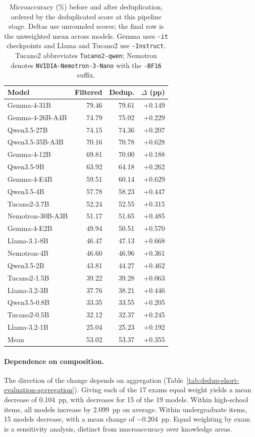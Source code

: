 \begin{table}[t]
\centering
\footnotesize
\setlength{\tabcolsep}{3pt}
\begin{tabular}{@{}lrrr@{}}
\toprule
Model & Filtered & Dedup. & $\Delta$ (pp) \\
\midrule
Gemma-4-31B & 79.46 & 79.61 & +0.149 \\
Gemma-4-26B-A4B & 74.79 & 75.02 & +0.229 \\
Qwen3.5-27B & 74.15 & 74.36 & +0.207 \\
Qwen3.5-35B-A3B & 70.16 & 70.78 & +0.628 \\
Gemma-4-12B & 69.81 & 70.00 & +0.188 \\
Qwen3.5-9B & 63.92 & 64.18 & +0.262 \\
Gemma-4-E4B & 59.51 & 60.14 & +0.629 \\
Qwen3.5-4B & 57.78 & 58.23 & +0.447 \\
Tucano2-3.7B & 52.24 & 52.55 & +0.315 \\
Nemotron-30B-A3B & 51.17 & 51.65 & +0.485 \\
Gemma-4-E2B & 49.94 & 50.51 & +0.570 \\
Llama-3.1-8B & 46.47 & 47.13 & +0.668 \\
Nemotron-4B & 46.60 & 46.96 & +0.361 \\
Qwen3.5-2B & 43.81 & 44.27 & +0.462 \\
Tucano2-1.5B & 39.22 & 39.28 & +0.063 \\
Llama-3.2-3B & 37.76 & 38.21 & +0.446 \\
Qwen3.5-0.8B & 33.35 & 33.55 & +0.205 \\
Tucano2-0.5B & 32.12 & 32.37 & +0.245 \\
Llama-3.2-1B & 25.04 & 25.23 & +0.192 \\
\midrule
Mean & 53.02 & 53.37 & +0.355 \\
\bottomrule
\end{tabular}
\caption{Microaccuracy (\%) before and after deduplication, ordered by the
deduplicated score at this pipeline stage. Deltas use unrounded scores; the final row is the
unweighted mean across models. Gemma uses \texttt{-it} checkpoints and
Llama and Tucano2 use \texttt{-Instruct}. Tucano2 abbreviates
\texttt{Tucano2-qwen}; Nemotron denotes \texttt{NVIDIA-Nemotron-3-Nano}
with the \texttt{-BF16} suffix.}
\label{tab:dedup-short-evaluation}
\end{table}

\paragraph{Dependence on composition.} The direction of the change depends
on aggregation (Table~\ref{tab:dedup-short-evaluation-aggregation}). Giving
each of the 17 exams equal weight yields a mean decrease of 0.104~pp, with
decreases for 15 of the 19 models. Within high-school items, all models
increase by 2.099~pp on average. Within undergraduate items, 15 models
decrease, with a mean change of $-0.204$~pp. Equal weighting by exam is a
sensitivity analysis, distinct from macroaccuracy over knowledge areas.

